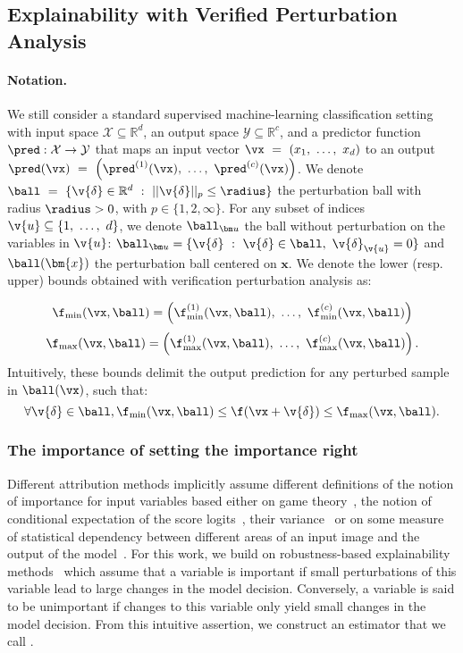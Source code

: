 \subsection{Explainability with Verified Perturbation Analysis}
\label{sec:eva:method}

\paragraph{Notation.} We still consider a standard supervised machine-learning classification setting with input space $\mathcal{X} \subseteq \mathbb{R}^d$, an output space $\mathcal{Y} \subseteq \mathbb{R}^c$, and a predictor function $\pred : \mathcal{X} \to \mathcal{Y}$ that maps an input vector $\vx~=~(x_1,~\ldots{},~x_d)$ to an output $\pred(\vx)~=~\left(\pred^{(1)}(\vx),~\ldots{},~\pred^{(c)}(\vx)\right)$.
We denote $\ball~=~\{\v{\delta} \in \mathbb{R}^d ~:~  || \v{\delta}||_{p} \leq \radius \}$ 
the perturbation ball with radius $\radius > 0$,  with 
$p \in \{1, 2, \infty\}$.
For any subset of indices $\v{u}\subseteq\{1,~\ldots{},~d\}$, we denote 
$\ballu$ the ball without perturbation on the variables in $\v{u}$:
$\ballu = \{ \v{\delta} ~:~ \v{\delta} \in \ball, ~ \v{\delta}_{\v{u}} = 0 \}$ and $\ball(\bm{x})$ the perturbation ball centered on $\bm{x}$. We denote the lower (resp. upper) bounds obtained with verification perturbation analysis as: 

$$
\lowerf(\vx, \ball) = \left(\lowerf^{(1)}(\vx, \ball),~\ldots{},~\lowerf^{(c)}(\vx, \ball)\right)
$$
$$
\upperf(\vx, \ball) = \left(\upperf^{(1)}(\vx, \ball),~\ldots{},~\upperf^{(c)}(\vx, \ball)\right).
$$
Intuitively, these bounds delimit the output prediction for any perturbed sample in $\ball(\vx)$, such that:
$$
\forall \v{\delta} \in \ball, \lowerf(\vx, \ball) \leq \f(\vx + \v{\delta}) \leq \upperf(\vx, \ball).
$$

\subsubsection{The importance of setting the importance right}

Different attribution methods implicitly assume different definitions of the notion of importance for input variables based either on game theory~\cite{lundberg2017unified}, the notion of conditional expectation of the score logits~\cite{petsiuk2018rise}, their variance~\cite{fel2021sobol} or on some  measure of statistical dependency between different areas of an input image and the output of the model~\cite{novello2022making}.
For this work, we build on robustness-based explainability methods~\cite{hsieh2020evaluations} which assume that a variable is important if small perturbations of this variable lead to large changes in the model decision.
Conversely, a variable is said to be unimportant if changes to this variable only yield small changes in the model decision.
From this intuitive assertion, we construct an estimator that we call \Adv.





